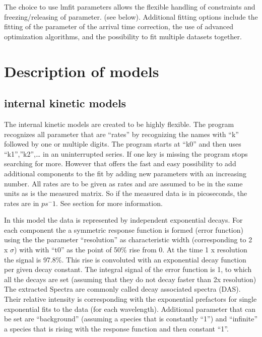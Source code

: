 \documentclass[letterpaper,10pt,english]{sphinxmanual}
\begin{document}
The choice to use lmfit parameters allows the flexible handling of
constraints and freezing/releasing of parameter. (see below). Additional
fitting options include the fitting of the parameter of the arrival time
correction, the use of advanced optimization algorithms, and the
possibility to fit multiple datasets together.


\section{Description of models}
\label{\detokenize{Fitting:description-of-models}}

\subsection{internal kinetic models}
\label{\detokenize{Fitting:internal-kinetic-models}}
The internal kinetic models are created to be highly flexible. The
program recognizes all parameter that are “rates” by recognizing the
names with “k” followed by one or multiple digits. The program starts at
“k0” and then uses “k1”,”k2”,… in an un\sphinxhyphen{}interrupted series. If one key
is missing the program stops searching for more. However that offers the
fast and easy possibility to add additional components to the fit by
adding new parameters with an increasing number. All rates are to be
given as rates and are assumed to be in the same units as is the
measured matrix. So if the measured data is in picoseconds, the rates
are in \(ps^-1\). See section {\hyperref[\detokenize{Shaping:data-shaping-settings-that-affect-the-fits}]{}}
for more information.

 In this model the data is represented by
independent exponential decays. For each component the a symmetric
response function is formed (error function) using the the parameter
“resolution” as characteristic width (corresponding to 2 x
\(\sigma\)) with with “t0” as the point of 50\(\%\) rise from
0. At the time 1 x resolution the signal is 97.8\(\%\). This rise
is convoluted with an exponential decay function per given decay
constant. The integral signal of the error function is 1, to which all
the decays are set (assuming that they do not decay faster than 2x
resolution) The extracted Spectra are commonly called decay associated
spectra (DAS). Their relative intensity is corresponding with the
exponential pre\sphinxhyphen{}factors for single exponential fits to the data (for
each wavelength). Additional parameter that can be set are “background”
(assuming a species that is constantly “1”) and “infinite” a species
that is rising with the response function and then constant “1”.
\end{document}
